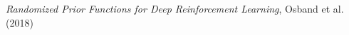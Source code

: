 \documentclass[preview]{standalone}
\begin{document}
\begin{center}
\textit{Randomized Prior Functions for Deep Reinforcement Learning}, Osband et al. (2018)
\end{center}
\end{document}
